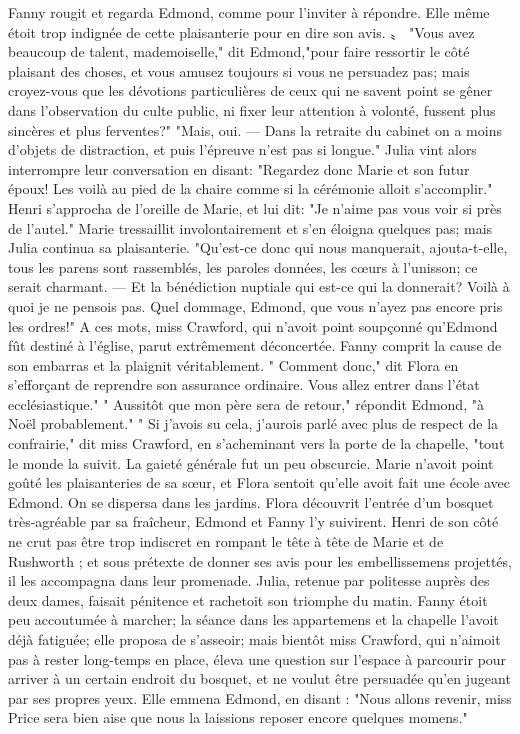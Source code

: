 Fanny rougit et regarda Edmond, comme pour l'inviter à répondre. Elle même étoit trop indignée de cette plaisanterie pour en dire son avis. 〟
"Vous avez beaucoup de talent, mademoiselle," dit Edmond,"pour faire ressortir\setcounter{page}{516} le côté plaisant des choses, et vous amusez toujours si vous ne persuadez pas; mais croyez-vous que les dévotions particulières de ceux qui ne savent point se gêner dans l'observation du culte public, ni fixer leur attention à volonté, fussent plus sincères et plus ferventes?"
"Mais, oui. — Dans la retraite du cabinet on a moins d'objets de distraction, et puis l'épreuve n'est pas si longue."
Julia vint alors interrompre leur conversation en disant: "Regardez donc Marie et son futur époux! Les voilà au pied de la chaire comme si la cérémonie alloit s'accomplir."
Henri s'approcha de l'oreille de Marie, et lui dit: "Je n'aime pas vous voir si près de l'autel."
Marie tressaillit involontairement et s'en éloigna quelques pas; mais Julia continua sa plaisanterie. "Qu'est-ce donc qui nous manquerait, ajouta-t-elle, tous les parens sont rassemblés, les paroles données, les cœurs à l'unisson; ce serait charmant. — Et la bénédiction nuptiale qui est-ce qui la donnerait? Voilà à quoi je ne pensois pas. Quel dommage, Edmond, que vous n'ayez pas encore pris les ordres!"\setcounter{page}{517} A ces mots, miss Crawford, qui n'avoit point soupçonné qu'Edmond fût destiné à l'église, parut extrêmement déconcertée. Fanny comprit la cause de son embarras et la plaignit véritablement.
" Comment donc," dit Flora en s'efforçant de reprendre son assurance ordinaire. Vous allez entrer dans l'état ecclésiastique."
" Aussitôt que mon père sera de retour," répondit Edmond, "à Noël probablement."
" Si j'avois su cela, j'aurois parlé avec plus de respect de la confrairie," dit miss Crawford, en s'acheminant vers la porte de la chapelle, "tout le monde la suivit. La gaieté générale fut un peu obscurcie. Marie n'avoit point goûté les plaisanteries de sa sœur, et Flora sentoit qu'elle avoit fait une école avec Edmond.
On se dispersa dans les jardins. Flora découvrit l'entrée d'un bosquet très-agréable par sa fraîcheur, Edmond et Fanny l'y suivirent. Henri de son côté ne crut pas être trop indiscret en rompant le tête à tête de Marie et de Rushworth ; et sous prétexte de donner ses avis pour les embellissemens projettés, il les accompagna dans leur promenade. Julia, retenue par politesse auprès des\setcounter{page}{518} deux dames, faisait pénitence et rachetoit son triomphe du matin.
Fanny étoit peu accoutumée à marcher; la séance dans les appartemens et la chapelle l'avoit déjà fatiguée; elle proposa de s'asseoir; mais bientôt miss Crawford, qui n'aimoit pas à rester long-temps en place, éleva une question sur l'espace à parcourir pour arriver à un certain endroit du bosquet, et ne voulut être persuadée qu'en jugeant par ses propres yeux. Elle emmena Edmond, en disant : "Nous allons revenir, miss Price sera bien aise que nous la laissions reposer encore quelques momens."
